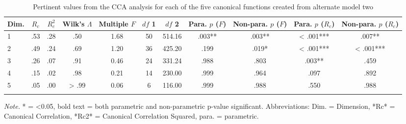 \documentclass[
  english,
  man,floatsintext]{apa6}
\begin{document}
\begin{table}[tbp]

\begin{center}
\begin{threeparttable}

\caption{\label{tab:alt2_ccatable}Pertinent values from the CCA analysis for each of the five canonical functions
          created from alternate model two}

\small{

\begin{tabular}{lcccccccccc}
\toprule
Dim. & $R_{c}$ & $R^{2}_{c}$ & Wilk’s $\Lambda$ & Multiple $F$ & $df$ 1 & $df$ 2 & Para. $p$ ($F$) & Non-para. $p$ ($F$) & Para. $p$ ($R_{c}$) & Non-para. $p$ ($R_{c}$)\\
\midrule
1 & .53 & .28 & .50 & 1.68 & 50 & 514.16 & .003** & .003** & < .001*** & .007**\\
2 & .49 & .24 & .69 & 1.20 & 36 & 425.20 & .199 & .019* & < .001*** & < .001***\\
3 & .26 & .07 & .91 & 0.46 & 24 & 331.24 & .988 & .803 & .003** & .459\\
4 & .15 & .02 & .98 & 0.21 & 14 & 230.00 & .999 & .964 & .097 & .892\\
5 & .05 & .00 & > .99 & 0.06 & 6 & 116.00 & .999 & .988 & .550 & .988\\
\bottomrule
\addlinespace
\end{tabular}

}

\begin{tablenotes}[para]
\normalsize{\textit{Note.} * = <0.05, bold text = both parametric and non-parametric p-value significant. 
          Abbreviations: Dim. = Dimension, *Rc* = Canonical Correlation, *Rc2* = Canonical 
          Correlation Squared, para. = parametric.}
\end{tablenotes}

\end{threeparttable}
\end{center}

\end{table}
\end{document}

